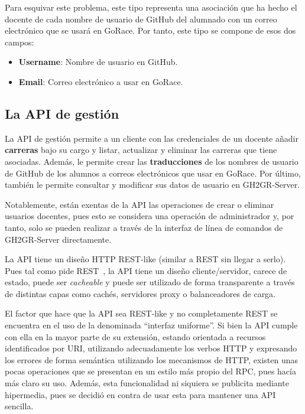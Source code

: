 Para esquivar este problema, este tipo representa una asociación que ha hecho el docente de cada nombre de usuario de GitHub del alumnado con un correo electrónico que se usará en GoRace. Por tanto, este tipo se compone de esos dos campos:

\begin{itemize}
    \item \textbf{Username}: Nombre de usuario en GitHub.
    \item \textbf{Email}: Correo electrónico a usar en GoRace.
\end{itemize}

\subsection{La API de gestión} \label{api-gesion}

La \acrshort{API} de gestión permite a un cliente con las credenciales de un docente añadir {\bf carreras} bajo su cargo y listar, actualizar y eliminar las carreras que tiene asociadas. 
Además, le permite crear las {\bf traducciones} de los nombres de usuario de GitHub de los alumnos a correos electrónicos que usar en GoRace. 
Por último, también le permite consultar y modificar sus datos de usuario en GH2GR-Server. 

Notablemente, están exentas de la \acrshort{API} las operaciones de crear o eliminar usuarios docentes, pues esto se considera una operación de administrador y, por tanto, solo se pueden realizar a través de la interfaz de línea de comandos de GH2GR-Server directamente.

La \acrshort{API} tiene un diseño \acrshort{HTTP} \acrshort{REST}-like (similar a \acrshort{REST} sin llegar a serlo). 
Pues tal como pide \acrshort{REST}~\cite{REST}, 
la \acrshort{API} tiene un diseño cliente/servidor, 
carece de estado, puede ser \textit{cacheable} 
y puede ser utilizado de forma transparente a través de distintas capas como cachés, servidores proxy o balanceadores de carga. 

El factor que hace que la \acrshort{API} sea \acrshort{REST}-like y no completamente \acrshort{REST} se encuentra en el uso de la denominada ``interfaz uniforme''. Si bien la \acrshort{API} cumple con ella en la mayor parte de su extensión, estando orientada a recursos identificados por \acrshort{URI}, utilizando adecuadamente los verbos \acrshort{HTTP} y expresando los errores de forma semántica utilizando los mecanismos de \acrshort{HTTP}, existen unas pocas operaciones que se presentan en un estilo más propio del \acrshort{RPC}, pues hacía más claro su uso. Además, esta funcionalidad ni siquiera se publicita mediante hipermedia, pues se decidió en contra de usar esta para mantener una \acrshort{API} sencilla.

